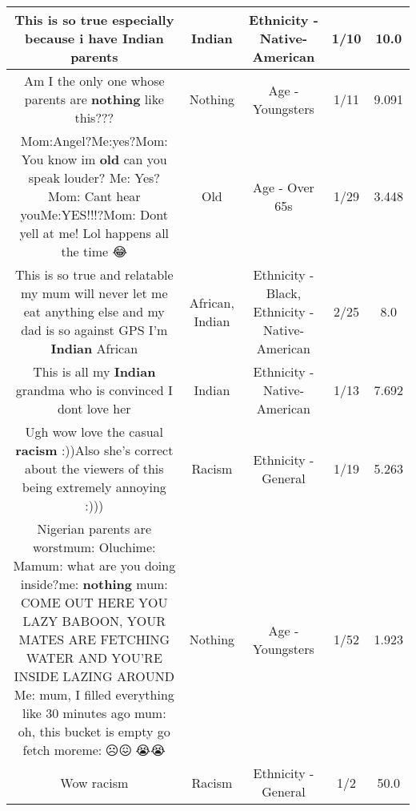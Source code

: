 \documentclass[11pt]{article}
\newlength\mylength
\begin{document}
\begin{center}
\begin{longtable}{|C{.65\mylength}|C{.30\mylength}|C{.12\mylength}|C{.12\mylength}|C{.12\mylength}|}
  \small This is so true especially because i have \textbf{Indian} parents\normalsize   & Indian & Ethnicity - Native-American & 1/10 & 10.0 \\  \hline
  \small Am I the only one whose parents are \textbf{nothing} like this???\normalsize   & Nothing & Age - Youngsters & 1/11 & 9.091 \\  \hline
  \small Mom:Angel?Me:yes?Mom: You know im \textbf{old} can you speak louder? Me: Yes?Mom: Cant hear youMe:YES!!!?Mom: Dont yell at me! Lol happens all the time 😂\normalsize   & Old & Age - Over 65s & 1/29 & 3.448 \\  \hline
  \small This is so true and relatable my mum will never let me eat anything else and my dad is so against GPS I'm \textbf{Indian} African\normalsize   & African, Indian & Ethnicity - Black, Ethnicity - Native-American & 2/25 & 8.0 \\  \hline
  \small This is all my \textbf{Indian} grandma who is convinced I dont love her\normalsize   & Indian & Ethnicity - Native-American & 1/13 & 7.692 \\  \hline
  \small Ugh wow love the casual \textbf{racism} :))Also she's correct about the viewers of this being extremely annoying :)))\normalsize   & Racism & Ethnicity - General & 1/19 & 5.263 \\  \hline
  \small Nigerian parents are worstmum: Oluchime: Mamum: what are you doing inside?me: \textbf{nothing} mum: COME OUT HERE YOU LAZY BABOON, YOUR MATES ARE FETCHING WATER AND YOU'RE INSIDE LAZING AROUND Me: mum, I filled everything like 30 minutes ago mum: oh, this bucket is empty go fetch moreme:🙁☹️😖😤😭😭\normalsize   & Nothing & Age - Youngsters & 1/52 & 1.923 \\  \hline
  \small Wow racism\normalsize   & Racism & Ethnicity - General & 1/2 & 50.0 \\  \hline

\end{longtable}
\end{center}
\end{document}
